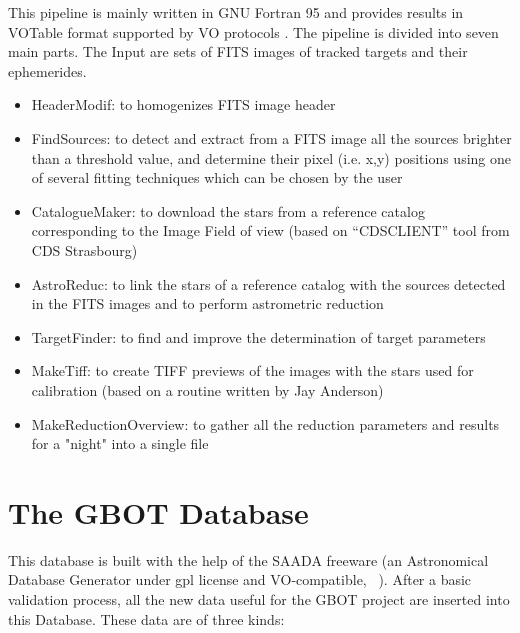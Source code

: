 This pipeline is mainly written in GNU Fortran 95 and provides results in VOTable format supported by VO protocols \citep{Bouquillon_2012}. The pipeline is divided into seven main parts. The Input are sets of FITS images of tracked targets and their ephemerides.
\begin{itemize}
\item HeaderModif: to homogenizes FITS image header
\item FindSources: to detect and extract from a FITS image all the sources brighter than a threshold value, and determine their pixel (i.e. x,y) positions using one of several fitting techniques which can be chosen by the user
\item CatalogueMaker: to download the stars from a reference catalog corresponding to the Image Field of view (based on “CDSCLIENT” tool from CDS Strasbourg)
\item AstroReduc: to link the stars of a reference catalog with the sources detected in the FITS images and to perform astrometric reduction
\item TargetFinder: to find and improve the determination of target parameters
\item MakeTiff: to create TIFF previews of the images with the stars used for calibration (based on a routine written by Jay Anderson)
\item MakeReductionOverview: to gather all the reduction parameters and results for a "night" into a single file
\end{itemize}


\section{The GBOT Database}

This database is built with the help of the SAADA freeware (an Astronomical Database Generator under gpl license and VO‑compatible, ~\cite{michel12}). After a basic validation process, all the new data useful for the GBOT project are inserted into this Database. These data are of three kinds:

